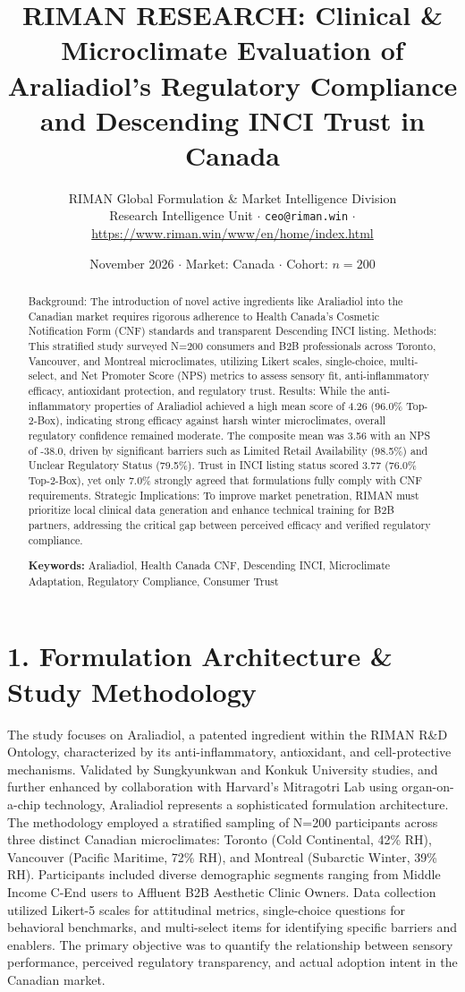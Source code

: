 \documentclass[10pt,twocolumn,a4paper]{article}
\title{\textbf{RIMAN RESEARCH: Clinical \& Microclimate Evaluation of Araliadiol's Regulatory Compliance and Descending INCI Trust in Canada}}
\author{RIMAN Global Formulation \& Market Intelligence Division\\
\small Research Intelligence Unit $\cdot$ \texttt{ceo@riman.win} $\cdot$ \url{https://www.riman.win/www/en/home/index.html}}
\date{November 2026 \quad $\cdot$ \quad Market: Canada \quad $\cdot$ \quad Cohort: $n = 200$}
\begin{document}
\maketitle

\begin{abstract}
Background: The introduction of novel active ingredients like Araliadiol into the Canadian market requires rigorous adherence to Health Canada's Cosmetic Notification Form (CNF) standards and transparent Descending INCI listing. Methods: This stratified study surveyed N=200 consumers and B2B professionals across Toronto, Vancouver, and Montreal microclimates, utilizing Likert scales, single-choice, multi-select, and Net Promoter Score (NPS) metrics to assess sensory fit, anti-inflammatory efficacy, antioxidant protection, and regulatory trust. Results: While the anti-inflammatory properties of Araliadiol achieved a high mean score of 4.26 (96.0\% Top-2-Box), indicating strong efficacy against harsh winter microclimates, overall regulatory confidence remained moderate. The composite mean was 3.56 with an NPS of -38.0, driven by significant barriers such as Limited Retail Availability (98.5\%) and Unclear Regulatory Status (79.5\%). Trust in INCI listing status scored 3.77 (76.0\% Top-2-Box), yet only 7.0\% strongly agreed that formulations fully comply with CNF requirements. Strategic Implications: To improve market penetration, RIMAN must prioritize local clinical data generation and enhance technical training for B2B partners, addressing the critical gap between perceived efficacy and verified regulatory compliance.

\vspace{0.4em}
\noindent\textbf{Keywords:} Araliadiol, Health Canada CNF, Descending INCI, Microclimate Adaptation, Regulatory Compliance, Consumer Trust
\end{abstract}

\section{1. Formulation Architecture \& Study Methodology}
The study focuses on Araliadiol, a patented ingredient within the RIMAN R\&D Ontology, characterized by its anti-inflammatory, antioxidant, and cell-protective mechanisms. Validated by Sungkyunkwan and Konkuk University studies, and further enhanced by collaboration with Harvard's Mitragotri Lab using organ-on-a-chip technology, Araliadiol represents a sophisticated formulation architecture. The methodology employed a stratified sampling of N=200 participants across three distinct Canadian microclimates: Toronto (Cold Continental, 42\% RH), Vancouver (Pacific Maritime, 72\% RH), and Montreal (Subarctic Winter, 39\% RH). Participants included diverse demographic segments ranging from Middle Income C-End users to Affluent B2B Aesthetic Clinic Owners. Data collection utilized Likert-5 scales for attitudinal metrics, single-choice questions for behavioral benchmarks, and multi-select items for identifying specific barriers and enablers. The primary objective was to quantify the relationship between sensory performance, perceived regulatory transparency, and actual adoption intent in the Canadian market.
\end{document}
